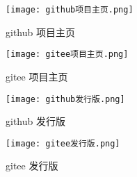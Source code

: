 \begin{figure}[htbp]
  \centering
  \texttt{[image: github项目主页.png]}
  \caption{github 项目主页}
  \label{figure:github项目主页}
\end{figure}

\begin{figure}[htbp]
  \centering
  \texttt{[image: gitee项目主页.png]}
  \caption{gitee 项目主页}
  \label{figure:gitee项目主页}
\end{figure}


\begin{figure}[htbp]
  \centering
  \texttt{[image: github发行版.png]}
  \caption{github 发行版}
  \label{figure:github发行版}
\end{figure}

\begin{figure}[htbp]
  \centering
  \texttt{[image: gitee发行版.png]}
  \caption{gitee 发行版}
  \label{figure:gitee发行版}
\end{figure}





